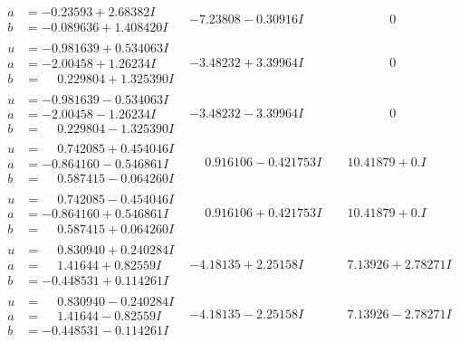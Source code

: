 \documentclass[1p]{elsarticle_modified}
\theoremstyle{definition}
\begin{document}
$$\begin{array}{c|c|c}
\begin{aligned}
a &= -0.23593 + 2.68382 I \\
b &= -0.089636 + 1.408420 I\end{aligned}
 & -7.23808 - 0.30916 I & \phantom{-0.000000 } 0 \\ \hline\begin{aligned}
u &= -0.981639 + 0.534063 I \\
a &= -2.00458 + 1.26234 I \\
b &= \phantom{-}0.229804 + 1.325390 I\end{aligned}
 & -3.48232 + 3.39964 I & \phantom{-0.000000 } 0 \\ \hline\begin{aligned}
u &= -0.981639 - 0.534063 I \\
a &= -2.00458 - 1.26234 I \\
b &= \phantom{-}0.229804 - 1.325390 I\end{aligned}
 & -3.48232 - 3.39964 I & \phantom{-0.000000 } 0 \\ \hline\begin{aligned}
u &= \phantom{-}0.742085 + 0.454046 I \\
a &= -0.864160 - 0.546861 I \\
b &= \phantom{-}0.587415 - 0.064260 I\end{aligned}
 & \phantom{-}0.916106 - 0.421753 I & \phantom{-}10.41879 + 0. I\phantom{ +0.000000I} \\ \hline\begin{aligned}
u &= \phantom{-}0.742085 - 0.454046 I \\
a &= -0.864160 + 0.546861 I \\
b &= \phantom{-}0.587415 + 0.064260 I\end{aligned}
 & \phantom{-}0.916106 + 0.421753 I & \phantom{-}10.41879 + 0. I\phantom{ +0.000000I} \\ \hline\begin{aligned}
u &= \phantom{-}0.830940 + 0.240284 I \\
a &= \phantom{-}1.41644 + 0.82559 I \\
b &= -0.448531 + 0.114261 I\end{aligned}
 & -4.18135 + 2.25158 I & \phantom{-}7.13926 + 2.78271 I \\ \hline\begin{aligned}
u &= \phantom{-}0.830940 - 0.240284 I \\
a &= \phantom{-}1.41644 - 0.82559 I \\
b &= -0.448531 - 0.114261 I\end{aligned}
 & -4.18135 - 2.25158 I & \phantom{-}7.13926 - 2.78271 I \\ \hline\begin{aligned}

\end{aligned}
\end{array}$$
\end{document}
